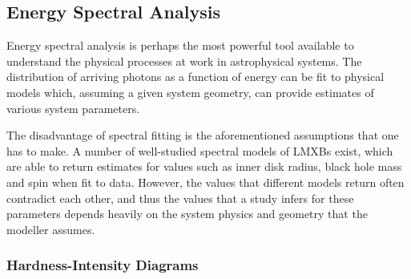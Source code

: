 \subsection{Energy Spectral Analysis}

\par Energy spectral analysis is perhaps the most powerful tool available to understand the physical processes at work in astrophysical systems.  The distribution of arriving photons as a function of energy can be fit to physical models which, assuming a given system geometry, can provide estimates of various system parameters.
\par The disadvantage of spectral fitting is the aforementioned assumptions that one has to make.  A number of well-studied spectral models of LMXBs exist, which are able to return estimates for values such as inner disk radius, black hole mass and spin when fit to data.  However, the values that different models return often contradict each other, and thus the values that a study infers for these parameters depends heavily on the system physics and geometry that the modeller assumes.

\subsubsection{Hardness-Intensity Diagrams}

